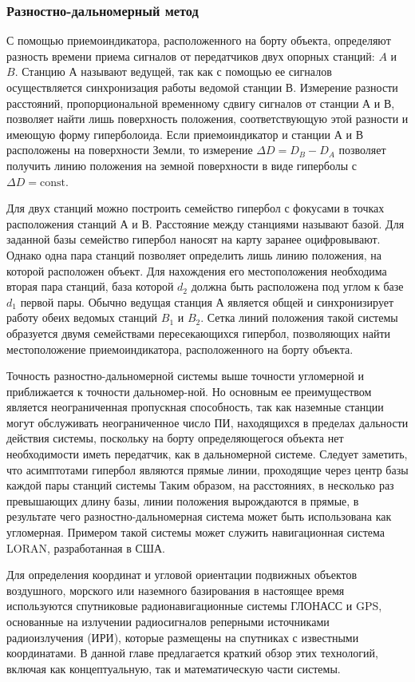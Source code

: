 \documentclass[../main.tex]{subfiles}
\begin{document}
\subsubsection{Разностно-дальномерный метод}
С помощью приемоиндикатора, расположенного на борту объекта, определяют разность времени приема сигналов от передатчиков двух опорных станций: $A$ и $B$. Станцию $А$ называют ведущей, так как с помощью ее сигналов осуществляется синхронизация работы ведомой станции $В$. Измерение разности расстояний, пропорциональной временному сдвигу сигналов от станции $А$ и $В$, позволяет найти лишь поверхность положения, соответствующую этой разности и имеющую форму гиперболоида. Если приемоиндикатор и станции $А$ и $В$ расположены на поверхности Земли, то измерение $\Delta D = D_B - D_A$ позволяет получить линию положения на земной поверхности в виде гиперболы с $\Delta D = \textrm{const}$.

Для двух станций можно построить семейство гипербол с фокусами в точках расположения станций $А$ и $В$. Расстояние между станциями называют базой. Для заданной базы семейство гипербол наносят на карту заранее оцифровывают. Однако одна пара станций позволяет определить лишь линию положения, на которой расположен объект. Для нахождения его местоположения необходима вторая пара станций, база которой $d_2$ должна быть расположена под углом к базе $d_1$ первой пары. Обычно ведущая станция $А$ является общей и синхронизирует работу обеих ведомых станций $B_1$ и $B_2$. Сетка линий положения такой системы образуется двумя семействами пересекающихся гипербол, позволяющих найти местоположение приемоиндикатора, расположенного на борту объекта.

Точность разностно-дальномерной системы выше точности угломерной и приближается к точности дальномер-ной. Но основным ее преимуществом является неограниченная пропускная способность, так как наземные станции могут обслуживать неограниченное число ПИ, находящихся в пределах дальности действия системы, поскольку на борту определяющегося объекта нет необходимости иметь передатчик, как в дальномерной системе. Следует заметить, что асимптотами гипербол являются прямые линии, проходящие через центр базы каждой пары станций системы Таким образом, на расстояниях, в несколько раз превышающих длину базы, линии положения вырождаются в прямые, в результате чего разностно-дальномерная система может быть использована как угломерная. Примером такой системы может служить навигационная система LORAN, разработанная в США.

Для определения координат и угловой ориентации подвижных объектов воздушного, морского или наземного базирования в настоящее время используются спутниковые радионавигационные системы ГЛОНАСС и GPS, основанные на излучении радиосигналов реперными источниками радиоизлучения (ИРИ), которые размещены на спутниках с известными координатами. В данной главе предлагается краткий обзор этих технологий, включая как концептуальную, так и математическую части системы.
\end{document}
